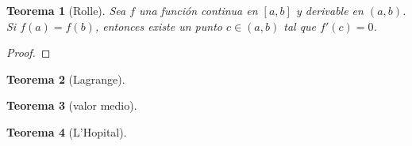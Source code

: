 \documentclass{report}
\newtheorem*{theorem}{Teorema}
\begin{document}
    \begin{theorem}[Rolle]
      Sea $f$ una función continua en $[a,b]$ y derivable en $(a,b)$. Si $f(a)=f(b)$,
      entonces existe un punto $c\in(a,b)$ tal que $f'(c)=0$.
    \end{theorem}
    \begin{proof}
    \end{proof}
    \begin{theorem}[Lagrange]
    \end{theorem}
    \begin{theorem}[valor medio]
    \end{theorem}
    \begin{theorem}[L'Hopital]
    \end{theorem}
\end{document}
